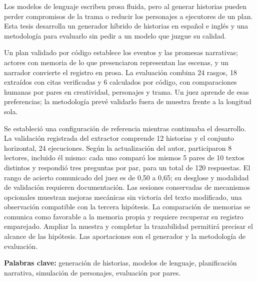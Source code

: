 \begin{resumen}
Los modelos de lenguaje escriben prosa fluida, pero al generar historias pueden perder compromisos
de la trama o reducir los personajes a ejecutores de un plan. Esta tesis desarrolla un generador
híbrido de historias en español e inglés y una metodología para evaluarlo sin pedir a un modelo
que juzgue su calidad.

Un plan validado por código establece los eventos y las promesas narrativas; actores con memoria
de lo que presenciaron representan las escenas, y un narrador convierte el registro en prosa.
La evaluación combina 24 rasgos, 18 extraídos con citas verificadas y 6 calculados por código, con
comparaciones humanas por pares en creatividad, personajes y trama. Un juez aprende de esas
preferencias; la metodología prevé validarlo fuera de muestra frente a la longitud sola.

Se estableció una configuración de referencia mientras continuaba el desarrollo. La validación
registrada del extractor comprende 12 historias y el conjunto horizontal, 24 ejecuciones. Según
la actualización del autor, participaron 8 lectores, incluido él mismo: cada uno comparó los mismos
5 pares de 10 textos distintos y respondió tres preguntas por par, para un total de 120 respuestas.
El rango de acierto comunicado del juez es de 0,50 a 0,65; su desglose y modalidad de validación
requieren documentación. Las sesiones conservadas de mecanismos opcionales muestran mejoras
mecánicas sin victoria del texto modificado, una observación compatible con la tercera hipótesis.
La comparación de memorias se comunica como favorable a la memoria propia y requiere recuperar su
registro emparejado. Ampliar la muestra y completar la trazabilidad permitirá precisar el alcance
de las hipótesis. Las aportaciones son el generador y la metodología de evaluación.

\medskip\noindent\textbf{Palabras clave:} generación de historias, modelos de lenguaje, planificación
narrativa, simulación de personajes, evaluación por pares.
\end{resumen}

